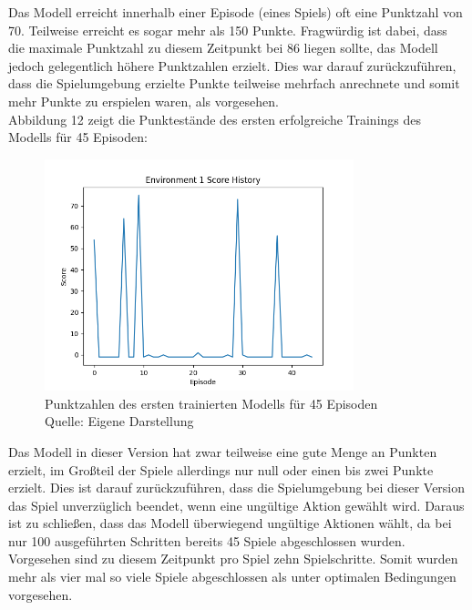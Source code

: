 Das Modell erreicht innerhalb einer Episode (eines Spiels) oft eine Punktzahl von 70. Teilweise erreicht es sogar mehr als 150 Punkte. Fragwürdig ist dabei, dass die maximale Punktzahl zu diesem Zeitpunkt bei 86 liegen sollte, das Modell jedoch gelegentlich höhere Punktzahlen erzielt. Dies war darauf zurückzuführen, dass die Spielumgebung erzielte Punkte teilweise mehrfach anrechnete und somit mehr Punkte zu erspielen waren, als vorgesehen.\\

Abbildung 12 zeigt die Punktestände des ersten erfolgreiche Trainings des Modells für 45 Episoden:
\nopagebreak
\begin{figure}[H]
	\centering
	\includegraphics[width=0.8\textwidth]{Bilder/firstpropertraining100steps} 
	\caption[Punktzahlen des ersten trainierten Modells für 45 Episoden]{Punktzahlen des ersten trainierten Modells für 45 Episoden\\ Quelle: Eigene Darstellung}
\end{figure}

Das Modell in dieser Version hat zwar teilweise eine gute Menge an Punkten erzielt, im Großteil der Spiele allerdings nur null oder einen bis zwei Punkte erzielt. Dies ist darauf zurückzuführen, dass die Spielumgebung bei dieser Version das Spiel unverzüglich beendet, wenn eine ungültige Aktion gewählt wird. Daraus ist zu schließen, dass das Modell überwiegend ungültige Aktionen wählt, da bei nur 100 ausgeführten Schritten bereits 45 Spiele abgeschlossen wurden. Vorgesehen sind zu diesem Zeitpunkt pro Spiel zehn Spielschritte. Somit wurden mehr als vier mal so viele Spiele abgeschlossen als unter optimalen Bedingungen vorgesehen.
